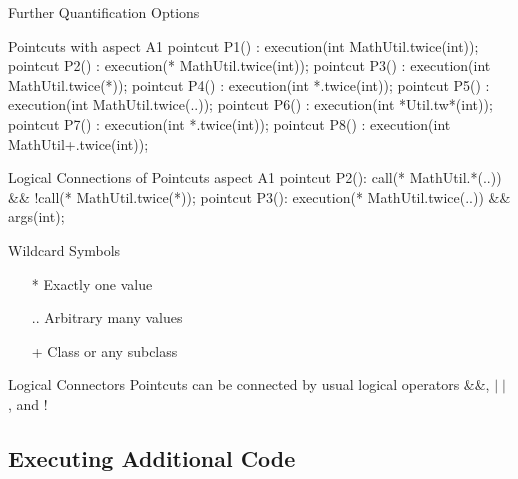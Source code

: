 \begin{frame}[fragile]{Further Quantification Options}
	\begin{mycolumns}[widths={70},animation=none]
\begin{codetight}{Pointcuts with }
aspect A1 {
	pointcut P1() : execution(int MathUtil.twice(int));
	pointcut P2() : execution(* MathUtil.twice(int));
	pointcut P3() : execution(int MathUtil.twice(*));
	pointcut P4() : execution(int *.twice(int));
	pointcut P5() : execution(int MathUtil.twice(..));
	pointcut P6() : execution(int *Util.tw*(int));
	pointcut P7() : execution(int *.twice(int));
	pointcut P8() : execution(int MathUtil+.twice(int));
}
\end{codetight}
\begin{codetight}{Logical Connections of Pointcuts}
aspect A1 {
	pointcut P2(): call(* MathUtil.*(..)) && !call(* MathUtil.twice(*));
	pointcut P3(): execution(* MathUtil.twice(..)) && args(int);
}
\end{codetight}
	\mynextcolumn
		\begin{note}{Wildcard Symbols}
			\begin{itemize}
				\item [*] Exactly one value
				\item [..] Arbitrary many values
				\item [+] Class or any subclass
			\end{itemize}
		\end{note}
		\begin{note}{Logical Connectors}
			Pointcuts can be connected by usual logical operators \&\&, $\mid\mid$, and !
		\end{note}
	\end{mycolumns}
\end{frame}

\subsection{Executing Additional Code}

